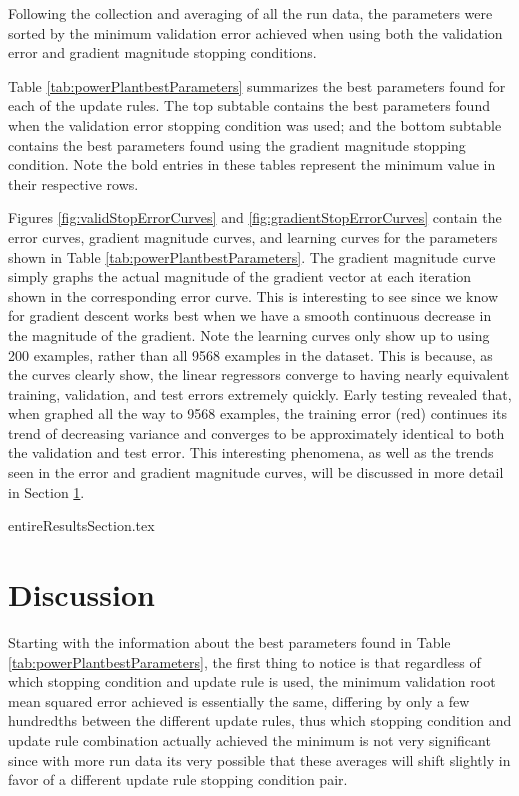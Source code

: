 \documentclass[runningheads]{llncs_2}
\begin{document}
Following the collection and averaging of all the run data, the parameters were sorted by the minimum validation error achieved when using both the validation error and gradient magnitude stopping conditions. 

Table \ref{tab:powerPlantbestParameters} summarizes the best parameters found for each of the update rules. The top subtable contains the best parameters found when the validation error stopping condition was used; and the bottom subtable contains the best parameters found using the gradient magnitude stopping condition. Note the bold entries in these tables represent the minimum value in their respective rows. 

Figures \ref{fig:validStopErrorCurves} and \ref{fig:gradientStopErrorCurves} contain the error curves, gradient magnitude curves, and learning curves for the parameters shown in Table \ref{tab:powerPlantbestParameters}. The gradient magnitude curve simply graphs the actual magnitude of the gradient vector at each iteration shown in the corresponding error curve. This is interesting to see since we know for gradient descent works best when we have a smooth continuous decrease in the magnitude of the gradient. Note the learning curves only show up to using 200 examples, rather than all 9568 examples in the dataset. This is because, as the curves clearly show, the linear regressors converge to having nearly equivalent training, validation, and test errors extremely quickly. Early testing revealed that, when graphed all the way to 9568 examples, the training error (red) continues its trend of decreasing variance and converges to be approximately identical to both the validation and test error. This interesting phenomena, as well as the trends seen in the error and gradient magnitude curves, will be discussed in more detail in Section \ref{sec:discussion}.

{entireResultsSection.tex}

\clearpage

\section {Discussion}
\label{sec:discussion}

Starting with the information about the best parameters found in Table \ref{tab:powerPlantbestParameters}, the first thing to notice is that regardless of which stopping condition and update rule is used, the minimum validation root mean squared error achieved is essentially the same, differing by only a few hundredths between the different update rules, thus which stopping condition and update rule combination actually achieved the minimum is not very significant since with more run data its very possible that these averages will shift slightly in favor of a different update rule stopping condition pair. 
\end{document}
